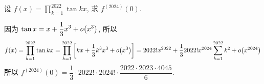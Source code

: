 \begin{example}[首届长三角高校高等数学竞赛]
    设 $ \displaystyle f(x)=\prod_{k=1}^{2022} \tan kx $, 求 $\displaystyle f^{(2024)}(0).$
\end{example}
\begin{solution}
    因为 $ \displaystyle \tan x=x+\dfrac{1}{3}x^3+o\qty(x^3) $, 所以
    $$\displaystyle f(x)=\prod_{k=1}^{2022} \tan kx=\prod_{k=1}^{2022} \qty[kx+\dfrac{1}{3}k^3x^3+o\qty(x^3)]=2022! x^{2022}+\dfrac{1}{3}2022!x^{2024}\sum_{k=1}^{2022}k^2+o\qty(x^{2024})$$
    所以 $f^{(2024)}(0)=\dfrac{1}{3}\cdot 2022!\cdot 2024! \cdot\dfrac{2022\cdot 2023\cdot 4045}{6}.$
\end{solution}